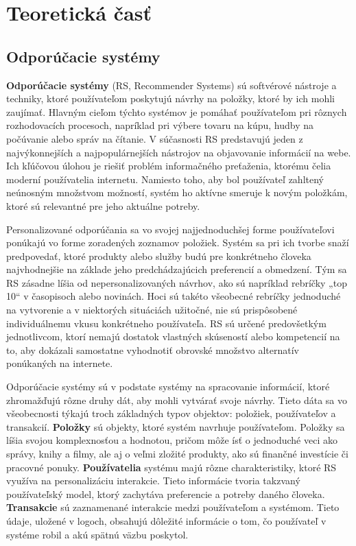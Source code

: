\section{Teoretická časť}\label{sec:TeoretickaCast}

\subsection{Odporúčacie systémy}
\textbf{Odporúčacie systémy} (RS, Recommender Systems) sú softvérové nástroje a techniky, ktoré používateľom poskytujú návrhy na položky, ktoré by ich mohli zaujímať. \cite{[17, 41, 42]vRicci} Hlavným cieľom týchto systémov je pomáhať používateľom pri rôznych rozhodovacích procesoch, napríklad pri výbere tovaru na kúpu, hudby na počúvanie alebo správ na čítanie. V súčasnosti RS predstavujú jeden z najvýkonnejších a najpopulárnejších nástrojov na objavovanie informácií na webe. \cite{Ricci} Ich kľúčovou úlohou je riešiť problém informačného preťaženia, ktorému čelia moderní používatelia internetu. Namiesto toho, aby bol používateľ zahltený neúnosným množstvom možností, systém ho aktívne smeruje k novým položkám, ktoré sú relevantné pre jeho aktuálne potreby.\cite{Ricci}

Personalizované odporúčania sa vo svojej najjednoduchšej forme používateľovi ponúkajú vo forme zoradených zoznamov položiek. Systém sa pri ich tvorbe snaží predpovedať, ktoré produkty alebo služby budú pre konkrétneho človeka najvhodnejšie na základe jeho predchádzajúcich preferencií a obmedzení. \cite{Ricci} Tým sa RS zásadne líšia od nepersonalizovaných návrhov, ako sú napríklad rebríčky „top 10“ v časopisoch alebo novinách. Hoci sú takéto všeobecné rebríčky jednoduché na vytvorenie a v niektorých situáciách užitočné, nie sú prispôsobené individuálnemu vkusu konkrétneho používateľa. \cite{Ricci} RS sú určené predovšetkým jednotlivcom, ktorí nemajú dostatok vlastných skúseností alebo kompetencií na to, aby dokázali samostatne vyhodnotiť obrovské množstvo alternatív ponúkaných na internete. \cite{42vRicci}

Odporúčacie systémy sú v podstate systémy na spracovanie informácií, ktoré zhromažďujú rôzne druhy dát, aby mohli vytvárať svoje návrhy. Tieto dáta sa vo všeobecnosti týkajú troch základných typov objektov: položiek, používateľov a transakcií.
\textbf{Položky} sú objekty, ktoré systém navrhuje používateľom. Položky sa líšia svojou komplexnosťou a hodnotou, pričom môže ísť o jednoduché veci ako správy, knihy a filmy, ale aj o veľmi zložité produkty, ako sú finančné investície či pracovné ponuky. \cite{Ricci, 39vRicci}
\textbf{Používatelia} systému majú rôzne charakteristiky, ktoré RS využíva na personalizáciu interakcie. Tieto informácie tvoria takzvaný používateľský model, ktorý zachytáva preferencie a potreby daného človeka. \cite{Ricci, 12,22vRicci}
\textbf{Transakcie} sú zaznamenané interakcie medzi používateľom a systémom. Tieto údaje, uložené v logoch, obsahujú dôležité informácie o tom, čo používateľ v systéme robil a akú spätnú väzbu poskytol. \cite{Ricci}

